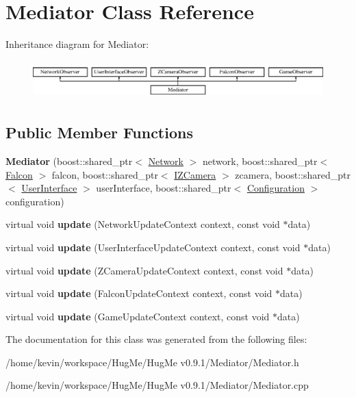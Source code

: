 \hypertarget{classMediator}{
\section{Mediator Class Reference}
\label{classMediator}
}
Inheritance diagram for Mediator:\begin{figure}[H]
\begin{center}
\leavevmode
\includegraphics[height=1.49333cm]{classMediator}
\end{center}
\end{figure}
\subsection*{Public Member Functions}
\begin{DoxyCompactItemize}
\item 
\hypertarget{classMediator_abbdd9e8fbf76b85a410aec8d47591876}{
{\bfseries Mediator} (boost::shared\_\-ptr$<$ \hyperlink{classNetwork}{Network} $>$ network, boost::shared\_\-ptr$<$ \hyperlink{classFalcon}{Falcon} $>$ falcon, boost::shared\_\-ptr$<$ \hyperlink{classIZCamera}{IZCamera} $>$ zcamera, boost::shared\_\-ptr$<$ \hyperlink{classUserInterface}{UserInterface} $>$ userInterface, boost::shared\_\-ptr$<$ \hyperlink{classConfiguration}{Configuration} $>$ configuration)}
\label{classMediator_abbdd9e8fbf76b85a410aec8d47591876}

\item 
\hypertarget{classMediator_ac85a7648a8c10a5b4db08412652d668b}{
virtual void {\bfseries update} (NetworkUpdateContext context, const void $\ast$data)}
\label{classMediator_ac85a7648a8c10a5b4db08412652d668b}

\item 
\hypertarget{classMediator_ae6aa511ce52b67c8e8da9a0810db0a87}{
virtual void {\bfseries update} (UserInterfaceUpdateContext context, const void $\ast$data)}
\label{classMediator_ae6aa511ce52b67c8e8da9a0810db0a87}

\item 
\hypertarget{classMediator_a86e3c5476aac2bc9858c80aef154a6f8}{
virtual void {\bfseries update} (ZCameraUpdateContext context, const void $\ast$data)}
\label{classMediator_a86e3c5476aac2bc9858c80aef154a6f8}

\item 
\hypertarget{classMediator_a62b886c8f9e0333f70db611947579a56}{
virtual void {\bfseries update} (FalconUpdateContext context, const void $\ast$data)}
\label{classMediator_a62b886c8f9e0333f70db611947579a56}

\item 
\hypertarget{classMediator_a3d3b23d768b19d551776ce295424366a}{
virtual void {\bfseries update} (GameUpdateContext context, const void $\ast$data)}
\label{classMediator_a3d3b23d768b19d551776ce295424366a}

\end{DoxyCompactItemize}


The documentation for this class was generated from the following files:\begin{DoxyCompactItemize}
\item 
/home/kevin/workspace/HugMe/HugMe v0.9.1/Mediator/Mediator.h\item 
/home/kevin/workspace/HugMe/HugMe v0.9.1/Mediator/Mediator.cpp\end{DoxyCompactItemize}
